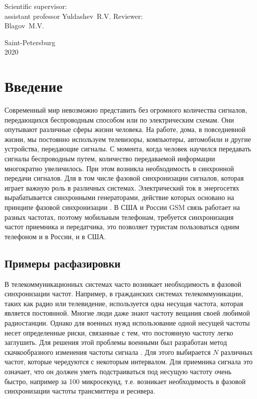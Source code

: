 \documentclass[a4paper,14pt]{article} %
\begin{document}
\hfill \break
\hfill \break
\hfill \break
 
 \small{
\begin{flushright}
Scientific supervisor:\\
assistant professor Yuldashev~R.\:V.
\break \break
\break \break
Reviewer:\\
Blagov~M.\:V.
\end{flushright}
}
\hfill \break
\hfill \break
\hfill \break
\hfill \break
\hfill \break
\hfill \break
\hfill \break
\hfill \break
\hfill \break
\hfill \break
\begin{center} Saint-Petersburg \\
2020 \end{center}
\thispagestyle{empty} %

\pagebreak
\tableofcontents


\newpage
\section{Введение}
Современный мир невозможно представить без огромного количества сигналов, передающихся беспроводным способом или по электрическим схемам. Они опутывают различные сферы жизни человека. На работе, дома, в повседневной жизни, мы постоянно используем телевизоры, компьютеры, автомобили и другие устройства, передающие сигналы. С момента, когда человек научился передавать сигналы беспроводным путем, количество передаваемой информации многократно увеличилось. При этом возникла необходимость в синхронной передачи сигналов. Для  в том числе фазовой синхронизации сигналов, которая играет важную роль в различных системах. Электрический ток в энергосетях вырабатывается синхронными генераторами, действие которых основано на принципе фазовой синхронизации \cite{ilie}. В США и России GSM связь работает на разных частотах, поэтому мобильным телефонам, требуется синхронизация частот приемника и передатчика, это позволяет туристам пользоваться одним телефоном и в России, и в США.

\subsection{Примеры расфазировки}
В телекоммуникационных системах часто возникает необходимость в фазовой синхронизации частот. Например, в гражданских системах телекоммуникации, таких как радио или телевидение, используется одна несущая частота, которая является постоянной. Многие люди даже знают частоту вещания своей любимой радиостанции. Однако для военных нужд использование одной несущей частоты несет определенные риски, связанные с тем, что постоянную частоту легко заглушить. Для решения этой проблемы военными был разработан метод скачкообразного изменения частоты сигнала \cite{ghulam}. Для этого выбирается $N$ различных частот, которые чередуются с некоторым интервалом. Для приемника сигнала это означает, что он должен уметь подстраиваться под несущую частоту очень быстро, например за 100 микросекунд, т.е. возникает необходимость в фазовой синхронизации частоты трансмиттера и ресивера. 
\end{document}
